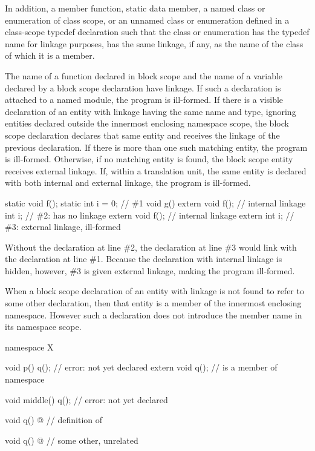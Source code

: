 \pnum
In addition, a member function, static data member, a named class or
enumeration of class scope, or an unnamed class or enumeration defined
in a class-scope typedef declaration such that the class or enumeration
has the typedef name for linkage purposes, has
the same linkage, if any, as the name of the class of which it is a
member.

\pnum
The name of a function declared in block scope and
the name of a variable declared by a block scope  declaration
have linkage.
If such a declaration is attached to a named module,
the program is ill-formed.
If there is a visible declaration
of an entity with linkage having the same name and type, ignoring entities declared
outside the innermost enclosing namespace scope, the block scope declaration declares
that same entity and receives the linkage of the previous declaration. If there is more
than one such matching entity, the program is ill-formed. Otherwise, if no matching
entity is found, the block scope entity receives external linkage.
If, within a translation unit, the same entity is declared with both
internal and external linkage, the program is ill-formed.
\begin{example}
\begin{codeblock}
static void f();
static int i = 0;               // \#1
void g() {
  extern void f();              // internal linkage
  int i;                        // \#2:  has no linkage
  {
    extern void f();            // internal linkage
    extern int i;               // \#3: external linkage, ill-formed
  }
}
\end{codeblock}

Without the declaration at line \#2,
the declaration at line \#3 would link with the declaration at line \#1.
Because the declaration with internal linkage is hidden, however,
\#3 is given external linkage, making the program ill-formed.
\end{example}

\pnum
When a block scope declaration of an entity with linkage is not found to
refer to some other declaration, then that entity is a member of the
innermost enclosing namespace. However such a declaration does not
introduce the member name in its namespace scope. \begin{example}

\begin{codeblock}
namespace X {
  void p() {
    q();                        // error:  not yet declared
    extern void q();            //  is a member of namespace 
  }

  void middle() {
    q();                        // error:  not yet declared
  }

  void q() { @\commentellip@ }        // definition of 
}

void q() { @\commentellip@ }          // some other, unrelated 
\end{codeblock}
\end{example}

